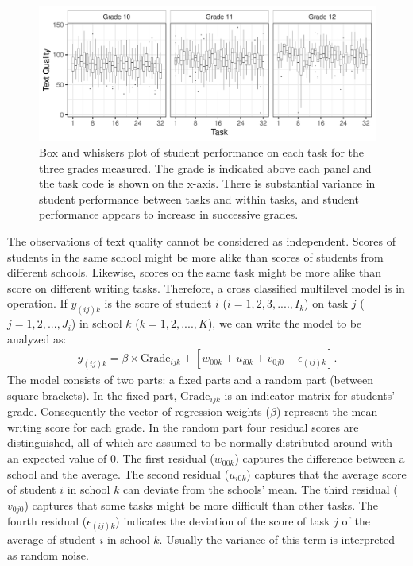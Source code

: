 \documentclass[a4paper]{article}
\begin{document}
\begin{figure}[!ht]
	\includegraphics[width=\textwidth]{descriptivesBaseline.pdf}
	\caption{Box and whiskers plot of student performance on each task for the three grades measured. The grade is indicated above each panel and the task code is shown on the x-axis. There is substantial variance in student performance between tasks and within tasks, and student performance appears to increase in successive grades.}
	\label{fig:baselineDescriptives}
\end{figure}
The observations of text quality cannot be considered as independent. Scores of students in the same school might be more alike than scores of students from different schools. Likewise, scores on the same task might be more alike than score on different writing tasks. Therefore, a cross classified multilevel model is in operation. If $y_{(ij)k}$ is the score of student $i$ ($i = 1, 2, 3, ...., I_k$) on task $j$ ($j = 1, 2, ..., J_i$) in school $k$ ($k = 1, 2, ...., K$), we can write the model to be analyzed as:
\begin{align*}
	y_{(ij)k} = \beta \times \mathrm{Grade}_{ijk} + [w_{00k} + u_{i0k} + v_{0j0} + \epsilon_{(ij)k}].
\end{align*}
The model consists of two parts: a fixed parts and a random part (between square brackets). In the fixed part, $\mathrm{Grade}_{ijk}$ is an indicator matrix for students' grade. Consequently the vector of regression weights ($\beta$) represent the mean writing score for each grade. In the random part four residual scores are distinguished, all of which are assumed to be normally distributed around with an expected value of 0. The first residual ($w_{00k}$) captures the difference between a school and the average. The second residual ($u_{i0k}$) captures that the average score of student $i$ in school $k$ can deviate from the schools' mean. The third residual ($v_{0j0}$) captures that some tasks might be more difficult than other tasks. The fourth residual ($\epsilon_{(ij)k}$) indicates the deviation of the score of task $j$ of the average of student $i$ in school $k$. Usually the variance of this term is interpreted as random noise.
\end{document}
